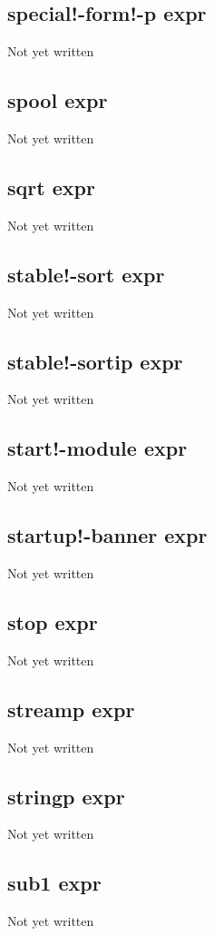 \documentclass[a4paper,11pt]{article}
\begin{document}
\subsection{\ttfamily special!-form!-p expr}
Not yet written

\subsection{\ttfamily spool expr}
Not yet written

\subsection{\ttfamily sqrt expr}
Not yet written

\subsection{\ttfamily stable!-sort expr}
Not yet written

\subsection{\ttfamily stable!-sortip expr}
Not yet written

\subsection{\ttfamily start!-module expr}
Not yet written

\subsection{\ttfamily startup!-banner expr}
Not yet written

\subsection{\ttfamily stop expr}
Not yet written

\subsection{\ttfamily streamp expr}
Not yet written

\subsection{\ttfamily stringp expr}
Not yet written

\subsection{\ttfamily sub1 expr}
Not yet written
\end{document}
